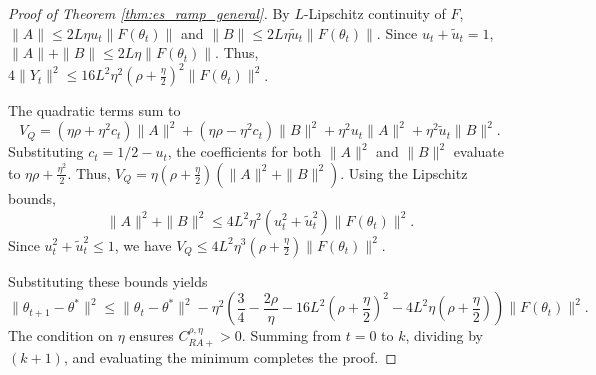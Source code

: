 \documentclass[letter,11pt]{article}
\begin{document}
\begin{proof}[Proof of Theorem \ref{thm:es_ramp_general}]
By $L$-Lipschitz continuity of $F$, $\|A\| \le 2L\eta u_t \|F(\theta_t)\|$ and $\|B\| \le 2L\eta \tilde{u}_t \|F(\theta_t)\|$. Since $u_t + \tilde{u}_t = 1$, $\|A\| + \|B\| \le 2L\eta \|F(\theta_t)\|$. Thus, $4\|Y_t\|^2 \le 16L^2\eta^2(\rho + \frac{\eta}{2})^2 \|F(\theta_t)\|^2$.

The quadratic terms sum to 
\begin{equation}
 V_Q = (\eta\rho + \eta^2 c_t)\|A\|^2 + (\eta\rho - \eta^2 c_t)\|B\|^2 + \eta^2 u_t \|A\|^2 + \eta^2 \tilde{u}_t \|B\|^2.
\end{equation}
Substituting $c_t = 1/2 - u_t$, the coefficients for both $\|A\|^2$ and $\|B\|^2$ evaluate to $\eta\rho + \frac{\eta^2}{2}$. Thus, $V_Q = \eta(\rho + \frac{\eta}{2})(\|A\|^2 + \|B\|^2)$. Using the Lipschitz bounds, 
\begin{equation}
 \|A\|^2 + \|B\|^2 \le 4L^2\eta^2 (u_t^2 + \tilde{u}_t^2) \|F(\theta_t)\|^2.
\end{equation}
Since $u_t^2 + \tilde{u}_t^2 \le 1$, we have $V_Q \le 4L^2\eta^3(\rho + \frac{\eta}{2}) \|F(\theta_t)\|^2$.

Substituting these bounds yields
\begin{equation}
\|\theta_{t+1} - \theta^*\|^2 \le \|\theta_t - \theta^*\|^2 - \eta^2 \left( \frac{3}{4} - \frac{2\rho}{\eta} - 16L^2\left(\rho + \frac{\eta}{2}\right)^2 - 4L^2\eta\left(\rho + \frac{\eta}{2}\right) \right) \|F(\theta_t)\|^2.
\end{equation}
The condition on $\eta$ ensures $C_{RA+}^{\rho,\eta} > 0$. Summing from $t=0$ to $k$, dividing by $(k+1)$, and evaluating the minimum completes the proof.
\end{proof}
\end{document}
